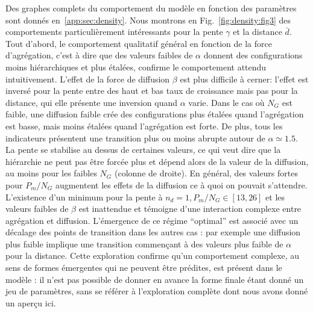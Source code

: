 {Des graphes complets du comportement du modèle en fonction des paramètres sont donnés en~\ref{app:sec:density}. Nous montrons en Fig.~\ref{fig:density:fig3} des comportements particulièrement intéressants pour la pente $\gamma$ et la distance $\bar{d}$. Tout d'abord, le comportement qualitatif général en fonction de la force d'agrégation, c'est à dire que des valeurs faibles de $\alpha$ donnent des configurations moins hiérarchiques et plus étalées, confirme le comportement attendu intuitivement. L'effet de la force de diffusion $\beta$ est plus difficile à cerner: l'effet est inversé pour la pente entre des haut et bas taux de croissance mais pas pour la distance, qui elle présente une inversion quand $\alpha$ varie. Dans le cas où $N_G$ est faible, une diffusion faible crée des configurations plus étalées quand l'agrégation est basse, mais moins étalées quand l'agrégation est forte. De plus, tous les indicateurs présentent une transition plus ou moins abrupte autour de $\alpha \simeq 1.5$. La pente se stabilise au dessus de certaines valeurs, ce qui veut dire que la hiérarchie ne peut pas être forcée plus et dépend alors de la valeur de la diffusion, au moins pour les faibles $N_G$ (colonne de droite). En général, des valeurs fortes pour $P_m/N_G$ augmentent les effets de la diffusion ce à quoi on pouvait s'attendre. L'existence d'un minimum pour la pente à $n_d=1,P_m/N_G\in\left[13,26\right]$ et les valeurs faibles de $\beta$ est inattendue et témoigne d'une interaction complexe entre agrégation et diffusion. L'émergence de ce régime ``optimal'' est associé avec un décalage des points de transition dans les autres cas : par exemple une diffusion plus faible implique une transition commençant à des valeurs plus faible de $\alpha$ pour la distance. Cette exploration confirme qu'un comportement complexe, au sens de formes émergentes qui ne peuvent être prédites, est présent dans le modèle : il n'est pas possible de donner en avance la forme finale étant donné un jeu de paramètres, sans se référer à l'exploration complète dont nous avons donné un aperçu ici.

}



